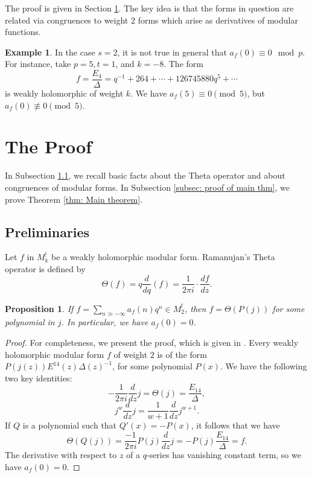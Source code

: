\documentclass[11pt]{article}
\newtheorem{proposition}[theorem]{Proposition}
\theoremstyle{definition}
\newtheorem*{example}{Example}
\numberwithin{equation}{subsection}
\begin{document}
The proof is given in Section \ref{Sec: The Proof}. The key idea is that the forms in question are related via congruences to weight $2$ forms which arise as derivatives of modular functions.

\begin{example}
In the case $s = 2$, it is not true in general that $a_f(0) \equiv 0 \mod p$. For instance, take $p = 5, t = 1$, and $k = -8$. The form
$$f = \frac{E_4}{\Delta} = q^{-1} + 264 + \cdots +  126745880q^5 + \cdots$$
is weakly holomorphic of weight $k$. We have $a_f(5) \equiv 0 \pmod 5$, but $a_f(0) \not \equiv 0 \pmod 5$.
\end{example}

\section{The Proof}\label{Sec: The Proof}

In Subsection \ref{subsec: preliminaries}, we recall basic facts about the Theta operator and about congruences of modular forms. In Subsection \ref{subsec: proof of main thm}, we prove Theorem \ref{thm: Main theorem}.

\subsection{Preliminaries}\label{subsec: preliminaries}

Let $f$ in $M_k^{!}$ be a weakly holomorphic modular form. Ramanujan's Theta operator is defined by 
$$ \Theta(f) = q \frac{d}{dq}(f) = \frac{1}{2 \pi i} \cdot \frac{d f}{dz}. $$

\begin{proposition}\label{prop: vanishing of constant term}
If $f = \sum_{n \gg - \infty} a_f(n) q^n \in M_2^{!}$, then $f = \Theta(P(j))$ for some polynomial in $j$. In particular, we have $a_f(0) = 0$.
\end{proposition}

\begin{proof}
For completeness, we present the proof, which is given in \cite{Seokho2016note}. Every weakly holomorphic modular form $f$ of weight $2$ is of the form $P(j(z)) E^{14}(z) \Delta(z)^{-1}$, for some polynomial $P(x)$. We have the following two key identities:
$$ - \frac{1}{2\pi i} \frac{d}{dz}j = \Theta(j) = \frac{E_{14}}{\Delta}, $$
$$ j^w \frac{d}{dz} j = \frac{1}{w + 1} \frac{d}{dz} j^{w+1}.$$
If $Q$ is a polynomial such that $Q'(x) = -P(x)$, it follows that we have
$$ \Theta( Q(j)) =  \frac{-1}{2 \pi i} P(j) \frac{d}{dz}j = -P(j) \frac{E_{14}}{\Delta} = f.  $$
The derivative with respect to $z$ of a $q$-series has vanishing constant term, so we have $a_f(0) = 0$. \qedhere


\end{proof}
\end{document}
